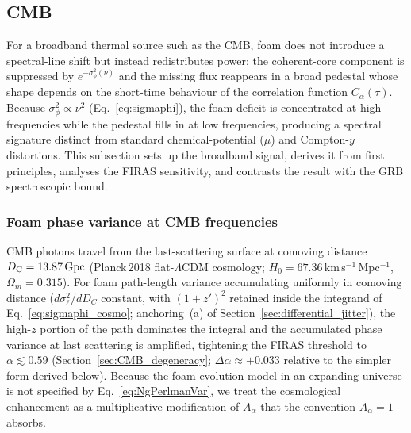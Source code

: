\documentclass[aps,prd,onecolumn,amsmath,amssymb]{revtex4-2}
\begin{document}
\subsection{CMB}
\label{sec:CMB}

For a broadband thermal source such as the CMB, foam does not introduce
a spectral-line shift but instead redistributes power: the coherent-core
component is suppressed by $e^{-\sigma_\phi^2(\nu)}$ and the missing flux
reappears in a broad pedestal whose shape depends on the short-time
behaviour of the correlation function $C_\alpha(\tau)$.  Because
$\sigma_\phi^2\propto\nu^2$ (Eq.~\eqref{eq:sigmaphi}), the foam deficit
is concentrated at high frequencies while the pedestal fills in at low
frequencies, producing a spectral signature distinct from standard
chemical-potential ($\mu$) and Compton-$y$ distortions.  This subsection
sets up the broadband signal, derives it from first principles, analyses
the FIRAS sensitivity, and contrasts the result with the GRB
spectroscopic bound.

\subsubsection{Foam phase variance at CMB frequencies}
\label{sec:CMB_phasevar}

CMB photons travel from the last-scattering surface at comoving distance
$D_{\rm C}= 13.87\,{\rm Gpc}$ (Planck\,2018 flat-$\Lambda$CDM cosmology;
$H_0 = 67.36$\,km\,s$^{-1}$\,Mpc$^{-1}$, $\Omega_m=0.315$).  For foam
path-length variance accumulating uniformly in comoving distance
($d\sigma_\ell^2/dD_C$ constant, with $(1+z')^2$ retained inside the
integrand of Eq.~\eqref{eq:sigmaphi_cosmo}; anchoring~(a) of
Section~\ref{sec:differential_jitter}), the high-$z$ portion of the
path dominates the integral and the accumulated phase variance at
last scattering is amplified, tightening the FIRAS threshold to
$\alpha\lesssim 0.59$ (Section~\ref{sec:CMB_degeneracy};
$\Delta\alpha\approx +0.033$ relative to the simpler form derived
below).  Because the foam-evolution model in an expanding universe is
not specified by Eq.~\eqref{eq:NgPerlmanVar}, we treat the
cosmological enhancement as a multiplicative modification of
$A_\alpha$ that the convention $A_\alpha=1$ absorbs.
\end{document}
